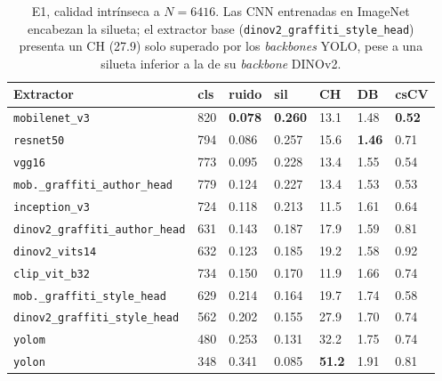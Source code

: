 \begin{table}[h]
  \centering
{\footnotesize
\begin{tabular}{|p{5.4cm}|p{1.0cm}|p{1.0cm}|p{1.0cm}|p{1.0cm}|p{1.0cm}|p{1.0cm}|} \hline
  \textbf{Extractor} & \textbf{cls} & \textbf{ruido} & \textbf{sil} & \textbf{CH} & \textbf{DB} & \textbf{csCV} \\ \hline
  \texttt{mobilenet\_v3}                  & 820 & \textbf{0.078} & \textbf{0.260} & 13.1 & 1.48 & \textbf{0.52} \\ \hline
  \texttt{resnet50}                       & 794 & 0.086 & 0.257 & 15.6 & \textbf{1.46} & 0.71 \\ \hline
  \texttt{vgg16}                          & 773 & 0.095 & 0.228 & 13.4 & 1.55 & 0.54 \\ \hline
  \texttt{mob.\_graffiti\_author\_head}   & 779 & 0.124 & 0.227 & 13.4 & 1.53 & 0.53 \\ \hline
  \texttt{inception\_v3}                  & 724 & 0.118 & 0.213 & 11.5 & 1.61 & 0.64 \\ \hline
  \texttt{dinov2\_graffiti\_author\_head} & 631 & 0.143 & 0.187 & 17.9 & 1.59 & 0.81 \\ \hline
  \texttt{dinov2\_vits14}                 & 632 & 0.123 & 0.185 & 19.2 & 1.58 & 0.92 \\ \hline
  \texttt{clip\_vit\_b32}                 & 734 & 0.150 & 0.170 & 11.9 & 1.66 & 0.74 \\ \hline
  \texttt{mob.\_graffiti\_style\_head}    & 629 & 0.214 & 0.164 & 19.7 & 1.74 & 0.58 \\ \hline
  \texttt{dinov2\_graffiti\_style\_head}  & 562 & 0.202 & 0.155 & 27.9 & 1.70 & 0.74 \\ \hline
  \texttt{yolom}                          & 480 & 0.253 & 0.131 & 32.2 & 1.75 & 0.74 \\ \hline
  \texttt{yolon}                          & 348 & 0.341 & 0.085 & \textbf{51.2} & 1.91 & 0.81 \\ \hline
\end{tabular}
}
  \caption[E1, calidad intrínseca a $N=6416$]{E1, calidad intrínseca a $N=6416$. Las CNN entrenadas en ImageNet encabezan la silueta; el extractor base
  (\texttt{dinov2\_graffiti\_style\_head}) presenta un CH (27.9) solo superado
  por los \textit{backbones} YOLO, pese a una silueta inferior a la de su
  \textit{backbone} DINOv2. \glosacalidad}
  \label{tab:e1-quality-6416}
\end{table}

